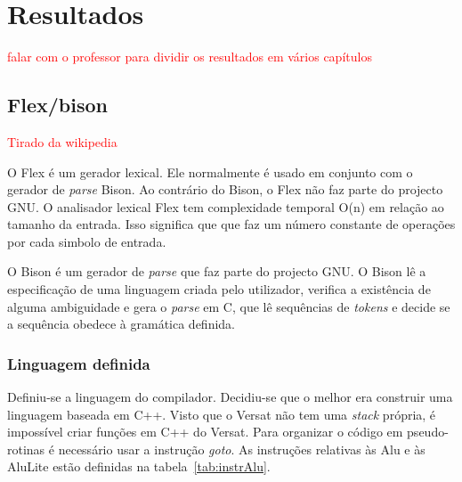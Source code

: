 

\chapter{Resultados}
\label{chapter:Resultados}

\textcolor{red}{ falar com o professor para dividir os resultados em vários capítulos}

\section{Flex/bison}
\label{section:Flex/bison}

\textcolor{red}{Tirado da wikipedia}

O Flex é um gerador lexical. Ele normalmente é usado em conjunto com o gerador de {\it parse} Bison. Ao contrário do Bison, o Flex não faz parte do projecto GNU.
O analisador lexical Flex tem complexidade temporal O(n) em relação ao tamanho da entrada. Isso significa que que faz um número constante de operações por cada simbolo de entrada. 

O Bison é um gerador de {\it parse} que faz parte do projecto GNU. O Bison lê a especificação de uma linguagem criada pelo utilizador, verifica a existência de alguma ambiguidade e gera o {\it parse} em C, que lê sequências de {\it tokens} e decide se a sequência obedece à gramática definida.


\subsection{Linguagem definida}
\label{section:Linguagem definida}

Definiu-se a linguagem do compilador. Decidiu-se que o melhor era construir uma linguagem baseada em C++. 
Visto que o Versat não tem uma {\it stack} própria, é impossível criar funções em C++ do Versat. Para organizar o código em pseudo-rotinas é necessário usar a instrução {\it goto}.
As instruções relativas às Alu e às AluLite estão definidas na tabela~\ref{tab:instrAlu}. 


